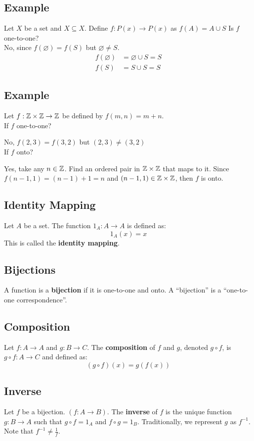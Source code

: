 \documentclass{math}
\begin{document}
\subsection*{Example}
Let \( X \) be a set and \( X \subseteq X \). Define \( f:P(x)\to P(x) \) as
\( f(A) = A \cup S \) Is \( f \) one-to-one? \\
No, since \( f(\varnothing) = f(S) \) but \( \varnothing \neq S \).
\begin{align*}
  f(\varnothing) &= \varnothing \cup S = S \\
  f(S) &= S \cup S = S
\end{align*}

\subsection*{Example}
Let \( f:\mathbb{Z}\times\mathbb{Z}\to\mathbb{Z} \) be defined by \( f(m,n) = m+n \). \\
If \( f \) one-to-one? \par
No, \( f(2,3) = f(3,2) \) but \( (2,3) \neq (3,2) \) \\
If \( f \) onto? \par
Yes, take any \( n\in\mathbb{Z} \). Find an ordered pair in \( \mathbb{Z}\times\mathbb{Z} \) that
maps to it. Since \( f(n-1,1) = (n-1)+1 = n \) and \( (n-1,1)\in\mathbb{Z}\times\mathbb{Z} \),
then \( f \) is onto.

\subsection*{Identity Mapping}
Let \( A \) be a set. The function \( 1_{A}:A\to A \) is defined as:
\[ 1_{A}(x) = x \]
This is called the \textbf{identity mapping}.

\subsection*{Bijections}
A function is a \textbf{bijection} if it is one-to-one and onto. A
``bijection'' is a ``one-to-one correspondence''.

\subsection*{Composition}
Let \( f:A\to A \) and \( g:B\to C \). The \textbf{composition} of \( f \)
and \( g \), denoted \( g\circ f \), is \( g\circ f:A\to C \) and defined as:
\[ (g\circ f)(x) = g(f(x)) \]

\subsection*{Inverse}
Let \( f \) be a bijection. \( (f:A\to B) \). The \textbf{inverse} of \( f \)
is the unique function \( g:B\to A \) such that \( g\circ f = 1_{A} \) and
\( f\circ g = 1_{B} \). Traditionally, we represent \( g \) as \( f^{-1} \).
Note that \( f^{-1} \neq \frac{1}{f} \).
\end{document}

